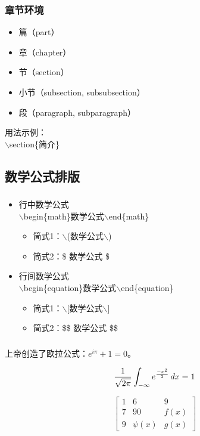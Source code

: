 \documentclass{beamer}
\begin{document}
  \frame
  {
    \frametitle{章节环境}
    \begin{itemize}
    \item 篇（part）
    \item 章（chapter）
    \item 节（section）
    \item 小节（subsection, subsubsection）
    \item 段（paragraph, subparagraph）
    \end{itemize}

    用法示例：\\
    $\backslash$section\{简介\}
  }

  \subsection{数学公式排版}
  \frame
  {
    \frametitle{\subsecname}
    \begin{itemize}
    \item 行中数学公式\\
    $\backslash$begin\{math\}数学公式$\backslash$end\{math\}
      \begin{itemize}
      \item 简式1：$\backslash$(数学公式$\backslash$)
      \item 简式2：\$ 数学公式 \$
      \end{itemize}
    \item 行间数学公式\\
    $\backslash$begin\{equation\}数学公式$\backslash$end\{equation\}
      \begin{itemize}
      \item 简式1：$\backslash$[数学公式$\backslash$]
      \item 简式2：\$\$ 数学公式 \$\$
      \end{itemize}
    \end{itemize}
  }

  \frame
  {
    \frametitle{\subsecname}

    上帝创造了欧拉公式：$e^{i\pi}+1=0$。

    \begin{equation*}
    \frac{1}{\sqrt{2\pi}}\int_{-\infty}e^{-{x^2} \over 2}\,dx = 1
    \end{equation*}

    \begin{equation*}
    \left[\begin{array}{cccc}
    1 &  6  & 9 \\
    7 &  90  & f(x) \\
    9 &  \psi(x)  &g(x)
    \end{array} \right]
    \end{equation*}
  }
\end{document}
